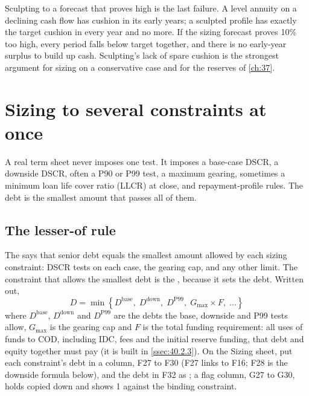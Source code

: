 Sculpting to a forecast that proves high is the last failure. A level annuity on a declining cash flow has cushion in its early years; a sculpted profile has exactly the target cushion in every year and no more. If the sizing forecast proves 10\% too high, every period falls below target together, and there is no early-year surplus to build up cash. Sculpting's lack of spare cushion is the strongest argument for sizing on a conservative case and for the reserves of \cref{ch:37}.

\section{Sizing to several constraints at once}\label{sec:36.3}

A real term sheet never imposes one test. It imposes a base-case DSCR, a downside DSCR, often a P90 or P99 test, a maximum gearing, sometimes a minimum loan life cover ratio (LLCR) at close, and repayment-profile rules. The debt is the smallest amount that passes all of them.

\subsection{The lesser-of rule}\label{ssec:36.3.1}

The  says that senior debt equals the smallest amount allowed by each sizing constraint: DSCR tests on each case, the gearing cap, and any other limit. The constraint that allows the smallest debt is the , because it sets the debt. Written out,
\begin{equation}\label{eq:36.4}
D = \min\left\{D^{\mathrm{base}},\; D^{\mathrm{down}},\; D^{\mathrm{P99}},\; G_{\max} \times F,\; \ldots\right\}
\end{equation}
where $D^{\mathrm{base}}$, $D^{\mathrm{down}}$ and $D^{\mathrm{P99}}$ are the debts the base, downside and P99 tests allow, $G_{\max}$ is the gearing cap and $F$ is the total funding requirement: all uses of funds to COD, including IDC, fees and the initial reserve funding, that debt and equity together must pay (it is built in \cref{ssec:40.2.3}). On the Sizing sheet, put each constraint's debt in a column, F27 to F30 (F27 links to F16; F28 is the downside formula below), and the debt in F32 as ; a flag column, G27 to G30, holds  copied down and shows 1 against the binding constraint.

